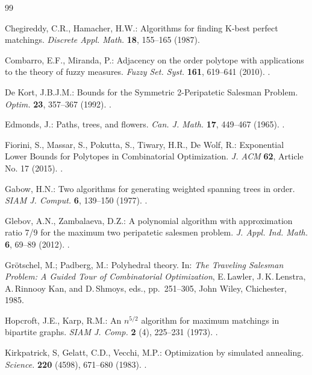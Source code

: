 \documentclass[runningheads]{llncs}
\begin{document}
\begin{thebibliography}{99}
	
	
	
	Chegireddy, C.R., Hamacher, H.W.: 
	Algorithms for finding K-best perfect matchings. 
	{\em Discrete Appl. Math.} {\bf 18}, 155--165 (1987).
	
	
	Combarro, E.F., Miranda, P.:
	Adjacency on the order polytope with applications to the theory of fuzzy measures.
	{\em Fuzzy Set. Syst.} {\bf 161}, 619--641 (2010).
	.
	
	
	De Kort, J.B.J.M.:
	Bounds for the Symmetric 2-Peripatetic Salesman Problem.
	{\em Optim.} {\bf 23}, 357--367 (1992).
	.
	
	
	Edmonds, J.:
	Paths, trees, and flowers.
	{\em Can. J. Math.} {\bf 17}, 449--467 (1965).
	.
		
	
	Fiorini, S., Massar, S., Pokutta, S., Tiwary, H.R., De Wolf, R.: 
	Exponential Lower Bounds for Polytopes in Combinatorial Optimization.
	{\em J. ACM} {\bf 62}, Article No. 17 (2015).
	.
	
	
	Gabow, H.N.:
	Two algorithms for generating weighted spanning trees in order.
	{\em SIAM J. Comput.} {\bf 6}, 139--150 (1977).
	.
	
	
	Glebov, A.N., Zambalaeva, D.Z.: 
	A polynomial algorithm with approximation ratio 7/9 for the maximum two peripatetic salesmen problem.
	{\em J. Appl. Ind. Math.} {\bf 6}, 69--89 (2012).
	.
	
	
	Gr\"{o}tschel, M.; Padberg, M.:
	Polyhedral theory. In: \textit{The Traveling Salesman Problem: A Guided Tour of Combinatorial Optimization}, E.\,Lawler, J.\,K.\,Lenstra, A.\,Rinnooy Kan, and
	D.\,Shmoys, eds., pp.~251--305, John Wiley, Chichester, 1985.
	
	
	Hopcroft, J.E., Karp, R.M.:
	An $n^{5 \slash 2}$ algorithm for maximum matchings in bipartite graphs.
	{\em SIAM J. Comp.} {\bf 2} (4), 225--231 (1973).
	.
	
		
	Kirkpatrick, S, Gelatt, C.D., Vecchi, M.P.: 
	Optimization by simulated annealing.
	{\em Science.} {\bf 220} (4598), 671--680 (1983).
	.
	

\end{thebibliography}
\end{document}
